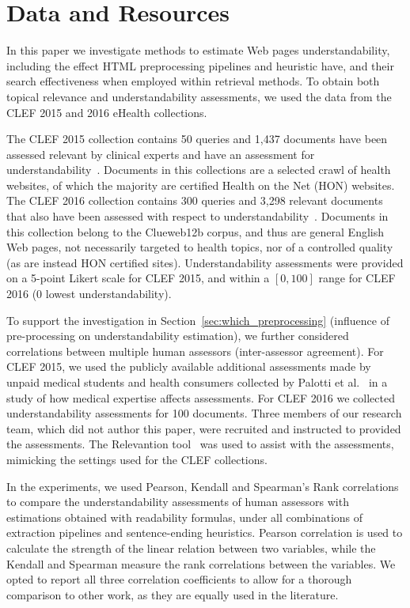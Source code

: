 \section{Data and Resources}

In this paper we investigate methods to estimate Web pages understandability, including the effect HTML preprocessing pipelines and heuristic have, and their search effectiveness when employed within retrieval methods. To obtain both topical relevance and  understandability assessments, we used the data from the CLEF 2015 and 2016 eHealth collections. 

The CLEF 2015 collection contains 50 queries and 1,437 documents have been assessed relevant by clinical experts and have an assessment for understandability~\cite{clef15}. Documents in this collections are a selected crawl of health websites, of which the majority are certified Health on the Net (HON) websites.
The CLEF 2016 collection contains 300 queries and 3,298 relevant documents that also have been assessed with respect to understandability~\cite{clef16}. Documents in this collection belong to the Clueweb12b corpus, and thus are general English Web pages, not necessarily targeted to health topics, nor of a controlled quality (as are instead HON certified sites). 
Understandability assessments were provided on a 5-point Likert scale for CLEF 2015, and within a $[0,100]$ range for CLEF 2016 (0 lowest understandability). 

To support the investigation in Section~\ref{sec:which_preprocessing} (influence of pre-processing on understandability estimation), we further considered correlations between multiple human assessors (inter-assessor agreement). For CLEF 2015, we used the publicly available additional assessments made by unpaid medical students and health consumers collected by Palotti et al.~\cite{palotti16b} in a study of how medical expertise affects assessments. For CLEF 2016 we  collected understandability assessments for 100 documents. Three members of our research team, which did not author this paper, were recruited and instructed to provided the assessments. The Relevantion tool~\cite{} was used to assist with the assessments, mimicking the settings used for the CLEF collections.


In the experiments, we used Pearson, Kendall and Spearman's Rank correlations to compare the understandability assessments of human assessors with estimations obtained with readability formulas, under all combinations of extraction pipelines and sentence-ending heuristics. Pearson correlation is used to calculate the strength of the linear relation between two variables, while the Kendall and Spearman measure the rank correlations between the variables. We opted to report all three correlation coefficients to allow for a thorough comparison to other work, as they are equally used in the literature. 

